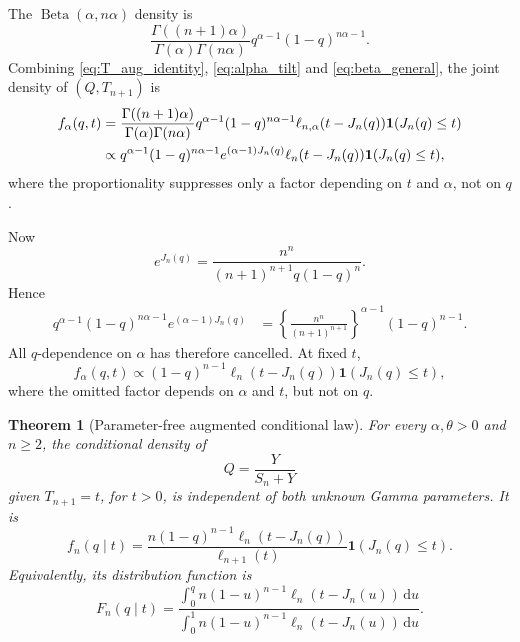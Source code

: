 \documentclass[11pt]{article}
\newtheorem{theorem}{Theorem}[section]
\theoremstyle{remark}
\newcommand{\ind}{\mathbf 1}
\newcommand{\dd}{\,\mathrm d}
\newcommand{\Bet}{\operatorname{Beta}}
\begin{document}
The $\Bet(\alpha,n\alpha)$ density is
\begin{equation}
 \frac{\Gamma((n+1)\alpha)}{\Gamma(\alpha)\Gamma(n\alpha)}
   q^{\alpha-1}(1-q)^{n\alpha-1}.
 \label{eq:beta_general}
\end{equation}
Combining \eqref{eq:T_aug_identity}, \eqref{eq:alpha_tilt} and \eqref{eq:beta_general}, the joint density of $(Q,T_{n+1})$ is
\begin{align}
 f_\alpha(q,t)
 &=\frac{\Gamma((n+1)\alpha)}{\Gamma(\alpha)\Gamma(n\alpha)}
   q^{\alpha-1}(1-q)^{n\alpha-1}
  \ell_{n,\alpha}(t-J_n(q))
  \ind(J_n(q)\le t) \notag\\
 &\propto
   q^{\alpha-1}(1-q)^{n\alpha-1}
   e^{(\alpha-1)J_n(q)}
  \ell_n(t-J_n(q))
  \ind(J_n(q)\le t),
 \label{eq:joint_before_cancel}
\end{align}
where the proportionality suppresses only a factor depending on $t$ and $\alpha$, not on $q$.

Now
\begin{equation}
 e^{J_n(q)}
 =\frac{n^n}{(n+1)^{n+1}q(1-q)^n}.
 \label{eq:eJ}
\end{equation}
Hence
\begin{align}
 q^{\alpha-1}(1-q)^{n\alpha-1}e^{(\alpha-1)J_n(q)}
 &=\left\{\frac{n^n}{(n+1)^{n+1}}\right\}^{\alpha-1}
   (1-q)^{n-1}.
 \label{eq:alpha_cancel}
\end{align}
All $q$-dependence on $\alpha$ has therefore cancelled. At fixed $t$,
\begin{equation}
 f_\alpha(q,t)
 \propto (1-q)^{n-1}
  \ell_n(t-J_n(q))
  \ind(J_n(q)\le t),
 \label{eq:joint_after_cancel}
\end{equation}
where the omitted factor depends on $\alpha$ and $t$, but not on $q$.

\begin{theorem}[Parameter-free augmented conditional law]
\label{thm:conditional_law}
For every $\alpha,\theta>0$ and $n\ge2$, the conditional density of
\[
 Q=\frac{Y}{S_n+Y}
\]
given $T_{n+1}=t$, for $t>0$, is independent of both unknown Gamma parameters. It is
\begin{equation}
 f_n(q\mid t)
 =\frac{n(1-q)^{n-1}\ell_n(t-J_n(q))}
        {\ell_{n+1}(t)}
   \ind(J_n(q)\le t).
 \label{eq:conditional_density}
\end{equation}
Equivalently, its distribution function is
\begin{equation}
 F_n(q\mid t)
 =\frac{\displaystyle\int_0^q n(1-u)^{n-1}
               \ell_n(t-J_n(u))\dd u}
        {\displaystyle\int_0^1 n(1-u)^{n-1}
               \ell_n(t-J_n(u))\dd u}.
 \label{eq:conditional_cdf}
\end{equation}
\end{theorem}
\end{document}
